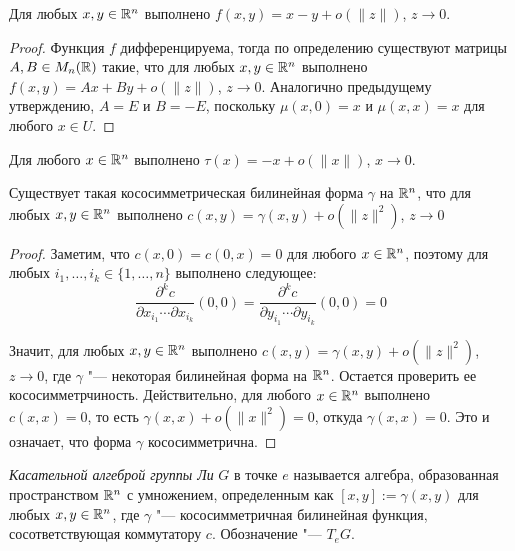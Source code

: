 \begin{proposition}
	Для любых $x, y \in \mathbb{R}^n$ выполнено $f(x, y) = x - y + o(\|z\|)$, $z \to 0$.
\end{proposition}

\begin{proof}
	Функция $f$ дифференцируема, тогда по определению существуют матрицы $A, B \in M_n(\mathbb{R})$ такие, что для любых $x, y \in \mathbb{R}^n$ выполнено $f(x, y) = Ax + By + o(\|z\|)$, $z \to 0$. Аналогично предыдущему утверждению, $A = E$ и $B = -E$, поскольку $\mu(x, 0) = x$ и $\mu(x, x) = x$ для любого $x \in U$.
\end{proof}

\begin{corollary}
	Для любого $x \in \mathbb{R}^n$ выполнено $\tau(x) = -x + o(\|x\|)$, $x \to 0$.
\end{corollary}

\begin{theorem}
	Существует такая кососимметрическая билинейная форма $\gamma$ на $\mathbb{R}^n$, что для любых $x, y \in \mathbb{R}^n$ выполнено $c(x, y) = \gamma(x, y) + o(\|z\|^2)$, $z \to 0$
\end{theorem}

\begin{proof}
	Заметим, что $c(x, 0) = c(0, x) = 0$ для любого $x \in \mathbb{R}^n$, поэтому для любых $i_1, \dotsc, i_k \in \{1, \dotsc, n\}$ выполнено следующее:
	\[\frac{\partial^k c}{\partial x_{i_1} \!\dotsb \partial x_{i_k}}(0, 0) = \frac{\partial^k c}{\partial y_{i_1} \!\dotsb \partial y_{i_k}}(0, 0) = 0\]
	
	Значит, для любых $x, y \in \mathbb{R}^n$ выполнено $c(x, y) = \gamma(x, y) + o(\|z\|^2)$, $z \to 0$, где $\gamma$ "--- некоторая билинейная форма на $\mathbb{R}^n$. Остается проверить ее кососимметрчиность. Действительно, для любого $x \in \mathbb{R}^n$ выполнено $c(x, x) = 0$, то есть $\gamma(x, x) + o(\|x\|^2) = 0$, откуда $\gamma(x, x) = 0$. Это и означает, что форма $\gamma$ кососимметрична.
\end{proof}

\begin{definition}
	\textit{Касательной алгеброй группы Ли} $G$ в точке $e$ называется алгебра, образованная пространством $\mathbb{R}^n$ с умножением, определенным как $[x, y] := \gamma(x, y)$ для любых $x, y \in \mathbb{R}^n$, где $\gamma$ "--- кососимметричная билинейная функция, сосответствующая коммутатору $c$. Обозначение "--- $T_e{G}$.
\end{definition}

